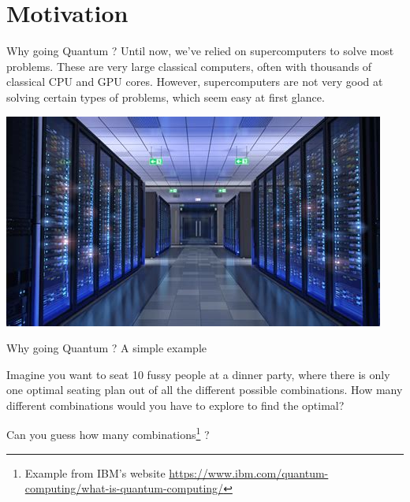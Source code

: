 \graphicspath{{assets/motivation/}}

\section[Motivation]{Motivation}

\begin{frame}{Why going Quantum ?}
	Until now, we’ve relied on supercomputers to solve most problems. These are very large classical computers, often with thousands of classical CPU and GPU cores. However, supercomputers are not very good at solving certain types of problems, which seem easy at first glance. 
	\begin{center}
	    \includegraphics[width=.7\linewidth]{supercomputer}
	\end{center}
\end{frame}

\begin{frame}{Why going Quantum ? A simple example}
	
Imagine you want to seat 10 fussy people at a dinner party, where there is only one optimal seating plan out of all the different possible combinations. How many different combinations would you have to explore to find the optimal?

Can you guess how many \alert{combinations}\footnote{Example from IBM's website \url{https://www.ibm.com/quantum-computing/what-is-quantum-computing/}} ?
\end{frame}


